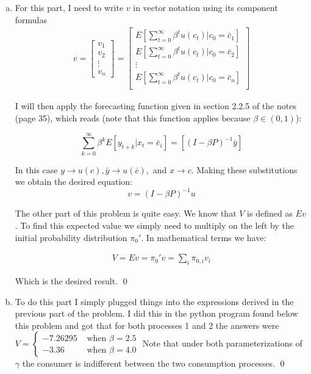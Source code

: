 \documentclass{homework}
\begin{document}
\begin{homeworkProblem}[Problem 2.3]
{      \begin{enumerate}[a.]
        \item For this part, I need to write $v$ in vector notation using its component formulas
           \begin{align*}
              v = \left[\begin{matrix} v_1 \\v_2 \\ \vdots \\ v_n \end{matrix}\right]
                 =\left[\begin{matrix}
                            E \left[\sum_{t=0}^{\infty} \beta^t u(c_t) | c_0 = \bar{c}_1 \right] \\
                            E \left[\sum_{t=0}^{\infty} \beta^t u(c_t) | c_0 = \bar{c}_2 \right]\\
                            \vdots \\
                            E \left[\sum_{t=0}^{\infty} \beta^t u(c_t) | c_0 = \bar{c}_n \right] \\
                          \end{matrix}\right]
           \end{align*}

           I will then apply the forecasting function given in section 2.2.5 of the notes (page 35), which reads (note that this function applies because $\beta \in (0, 1)$):

           $$ \sum_{k=0}^{\infty} \beta^k E \left[y_{t+k} |x_t = \bar{e}_i \right] = \left[ (I - \beta P)^{-1}\bar{y}\right] $$

           In this case $y \rightarrow u(c), \bar{y} \rightarrow u(\bar{c}), $ and $ x \rightarrow c$. Making these substitutions we obtain the desired equation: $$ v = (I - \beta P)^{-1} u $$

           The other part of this problem is quite easy. We know that $V$ is defined as $Ev$. To find this expected value we simply need to multiply on the left by the initial probability distribution $\pi_0'$. In mathematical terms we have:

           \begin{align*}
              V = Ev = \pi_0' v = \sum_i \pi_{0, i} v_i
           \end{align*}

           Which is the desired result. \qed

          \item To do this part I simply plugged things into the expressions derived in the previous part of the problem. I did this in the python program found below this problem and got that for both processes 1 and 2 the answers were $V = \begin{cases} -7.26295 & \text{ when } \beta = 2.5 \\ -3.36 & \text{ when } \beta = 4.0 \end{cases}$ Note that under both parameterizations of $\gamma$ the consumer is indifferent between the two consumption processes. \qed


\end{enumerate}}
\end{homeworkProblem}
\end{document}
